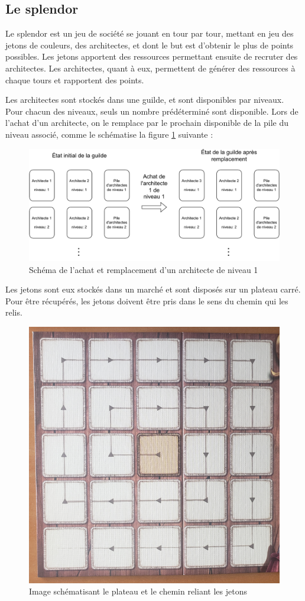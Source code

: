 
\subsection{Le splendor}

Le splendor est un jeu de société se jouant en tour par tour, mettant en jeu des jetons de couleurs, des architectes, et dont le but est d'obtenir le plus de points possibles. Les jetons apportent des ressources permettant ensuite de recruter des architectes. Les architectes, quant à eux, permettent de générer des ressources à chaque tours et rapportent des points.

Les architectes sont stockés dans une guilde, et sont disponibles par niveaux. Pour chacun des niveaux, seuls un nombre prédéterminé sont disponible. Lors de l'achat d'un architecte, on le remplace par le prochain disponible de la pile du niveau associé, comme le schématise la figure \ref{fig:buy_builder} suivante : 

\begin{figure}[H]
    \centering
    \includegraphics[width=.8\textwidth]{img/guild.pdf}
    \caption{Schéma de l'achat et remplacement d'un architecte de niveau 1}
    \label{fig:buy_builder}
\end{figure}

Les jetons sont eux stockés dans un marché et sont disposés sur un plateau carré. Pour être récupérés, les jetons doivent être pris dans le sens du chemin qui les relis.

\begin{figure}[H]
    \centering
    \includegraphics[width=.4\textwidth]{img/projMunificenceBoard.png}
    \caption{Image schématisant le plateau et le chemin reliant les jetons}
    \label{fig:board_example}
\end{figure}


